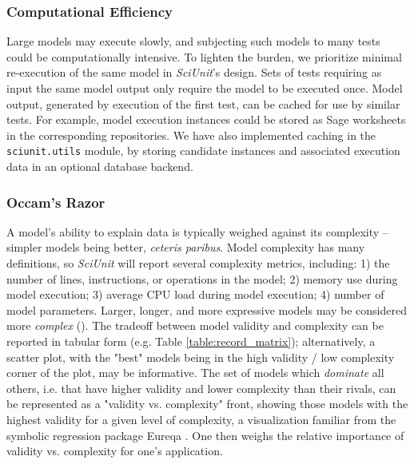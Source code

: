 \documentclass[11pt,letterpaper]{article}
\begin{document}
\subsubsection{Computational Efficiency}
Large models may execute slowly, and subjecting such models to many tests could be computationally intensive.  To lighten the burden, we prioritize minimal re-execution of the same model in \textit{SciUnit}'s design.  Sets of tests requiring as input the same model output only require the model to be executed once.  Model output, generated by execution of the first test, can be cached for use by similar tests.  For example, model execution instances could be stored as Sage worksheets in the corresponding repositories.  We have also implemented caching in the \verb|sciunit.utils| module, by storing candidate instances and associated execution data in an optional database backend.  

\subsubsection{Occam's Razor}
A model's ability to explain data is typically weighed against its complexity -- simpler models being better, \textit{ceteris paribus}.  Model complexity has many definitions, so \textit{SciUnit} will report several complexity metrics, including: 1) the number of lines, instructions, or operations in the model; 2) memory use during model execution; 3) average CPU load during model execution; 4) number of model parameters.  Larger, longer, and more expressive models may be considered more \textit{complex} (\cite{mccabe_complexity_1976}).  The tradeoff between model validity and complexity can be reported in tabular form (e.g. Table \ref{table:record_matrix}); alternatively, a scatter plot, with the "best" models being in the high validity / low complexity corner of the plot, may be informative.  The set of models which \textit{dominate} all others, i.e. that have higher validity and lower complexity than their rivals, can be represented as a "validity vs. complexity" front, showing those models with the highest validity for a given level of complexity, a visualization familiar from the symbolic regression package Eureqa \cite{schmidt_distilling_2009}.  One then weighs the relative importance of validity vs. complexity for one's application.  
\end{document}
